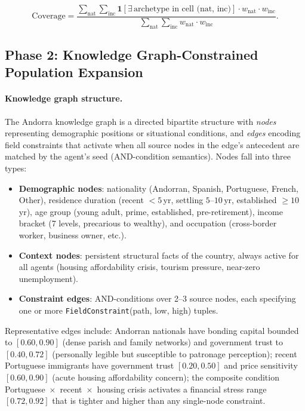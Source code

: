 \documentclass[sustainability,article,submit,pdftex,moreauthors]{Definitions/mdpi}
\begin{document}
\begin{linenomath}
\begin{equation}
  \text{Coverage} =
    \frac{\displaystyle\sum_{\text{nat}} \sum_{\text{inc}}
           \mathbf{1}[\exists\,\text{archetype in cell (nat, inc)}]
           \cdot w_\text{nat} \cdot w_\text{inc}}
         {\displaystyle\sum_{\text{nat}} \sum_{\text{inc}}
           w_\text{nat} \cdot w_\text{inc}}.
  \label{eq:coverage}
\end{equation}
\end{linenomath}

\subsection{Phase 2: Knowledge Graph-Constrained Population Expansion}
\label{subsec:expansion}

\paragraph{Knowledge graph structure.}
The Andorra knowledge graph is a directed bipartite structure with
\emph{nodes} representing demographic positions or situational conditions,
and \emph{edges} encoding field constraints that activate when all source
nodes in the edge's antecedent are matched by the agent's seed
(AND-condition semantics). Nodes fall into three types:

\begin{itemize}
\item \textbf{Demographic nodes}: nationality (Andorran, Spanish, Portuguese,
      French, Other), residence duration (recent $<5$\,yr, settling $5$--$10$\,yr,
      established $\geq10$\,yr), age group (young adult, prime, established,
      pre-retirement), income bracket (7 levels, precarious to wealthy),
      and occupation (cross-border worker, business owner, etc.).
\item \textbf{Context nodes}: persistent structural facts of the country,
      always active for all agents (housing affordability crisis, tourism
      pressure, near-zero unemployment).
\item \textbf{Constraint edges}: AND-conditions over 2--3 source nodes,
      each specifying one or more \texttt{FieldConstraint}(path, low, high)
      tuples.
\end{itemize}

Representative edges include: Andorran nationals have bonding capital
bounded to $[0.60, 0.90]$ (dense parish and family networks) and government
trust to $[0.40, 0.72]$ (personally legible but susceptible to patronage
perception); recent Portuguese immigrants have government trust $[0.20, 0.50]$
and price sensitivity $[0.60, 0.90]$ (acute housing affordability concern);
the composite condition Portuguese~$\times$~recent~$\times$~housing crisis
activates a financial stress range $[0.72, 0.92]$ that is tighter and higher
than any single-node constraint.
\end{document}
